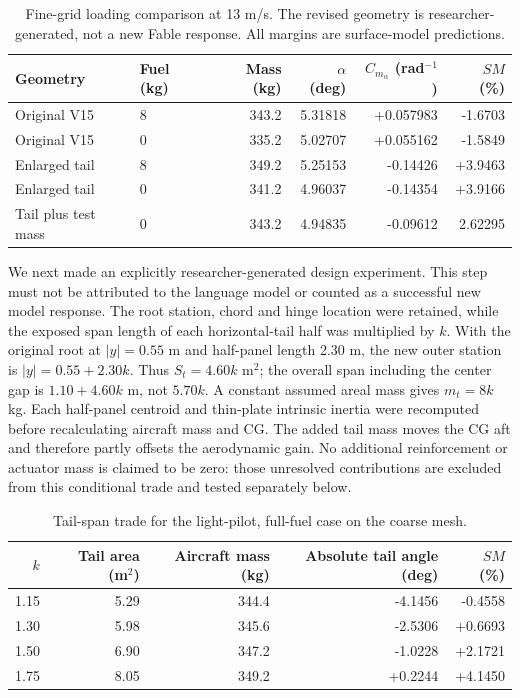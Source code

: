 \documentclass[10pt,letterpaper]{article}
\begin{document}
\begin{table}[htbp]
\centering\small
\caption{Fine-grid loading comparison at 13 m/s. The revised geometry is researcher-generated, not a new Fable response. All margins are surface-model predictions.}
\label{tab:tail-loading}
\begin{tabular}{llrrrr}
\toprule
Geometry & Fuel (kg) & Mass (kg) & $\alpha$ (deg) & $C_{m_\alpha}$ (rad$^{-1}$) & $SM$ (\%)\\
\midrule
Original V15 & 8 & 343.2 & 5.31818 & +0.057983 & -1.6703\\
Original V15 & 0 & 335.2 & 5.02707 & +0.055162 & -1.5849\\
Enlarged tail & 8 & 349.2 & 5.25153 & -0.14426 & +3.9463\\
Enlarged tail & 0 & 341.2 & 4.96037 & -0.14354 & +3.9166\\
Tail plus test mass & 0 & 343.2 & 4.94835 & -0.09612 & 2.62295\\
\bottomrule
\end{tabular}
\end{table}

We next made an explicitly researcher-generated design experiment. This step
must not be attributed to the language model or counted as a successful new
model response. The root station, chord and hinge location were retained,
while the exposed span length of each horizontal-tail half was multiplied by
$k$. With the original root at $|y|=0.55$ m and half-panel length 2.30 m, the
new outer station is $|y|=0.55+2.30k$. Thus $S_t=4.60k$ m$^2$; the overall
span including the center gap is $1.10+4.60k$ m, not $5.70k$. A constant
assumed areal mass gives $m_t=8k$ kg. Each half-panel centroid and thin-plate
intrinsic inertia were recomputed before recalculating aircraft mass and CG.
The added tail mass moves the CG aft and therefore partly offsets the
aerodynamic gain. No additional reinforcement or actuator mass is claimed to
be zero: those unresolved contributions are excluded from this conditional
trade and tested separately below.

\begin{table}[htbp]
\centering\small
\caption{Tail-span trade for the light-pilot, full-fuel case on the coarse mesh.}
\label{tab:tail-span-trade}
\begin{tabular}{rrrrr}
\toprule
$k$ & Tail area (m$^2$) & Aircraft mass (kg) & Absolute tail angle (deg) & $SM$ (\%)\\
\midrule
1.15 & 5.29 & 344.4 & -4.1456 & -0.4558\\
1.30 & 5.98 & 345.6 & -2.5306 & +0.6693\\
1.50 & 6.90 & 347.2 & -1.0228 & +2.1721\\
1.75 & 8.05 & 349.2 & +0.2244 & +4.1450\\
\bottomrule
\end{tabular}
\end{table}
\end{document}
